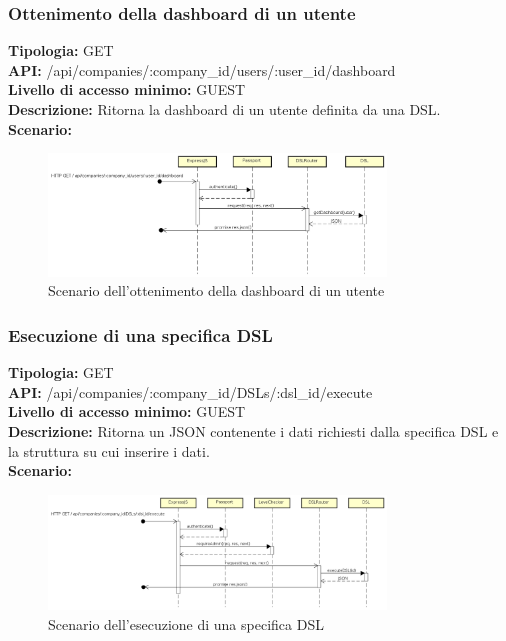 \newpage
\subsubsection{Ottenimento della dashboard di un utente}
\textbf{Tipologia:} GET \\
\textbf{API:} /api/companies/:company\_id/users/:user\_id/dashboard \\
\textbf{Livello di accesso minimo:} GUEST \\
\textbf{Descrizione:} Ritorna la dashboard di un utente definita da una DSL. \\
\textbf{Scenario:}  
\begin{figure}[h]
\centering
\includegraphics[width=0.8\textwidth]{res/sections/backend/(GET)dashboard.png}
\caption{Scenario dell'ottenimento della dashboard di un utente}
\end{figure}

\newpage
\subsubsection{Esecuzione di una specifica DSL}
\textbf{Tipologia:} GET \\
\textbf{API:} /api/companies/:company\_id/DSLs/:dsl\_id/execute \\
\textbf{Livello di accesso minimo:} GUEST \\
\textbf{Descrizione:} Ritorna un JSON contenente i dati richiesti dalla specifica DSL e la struttura su cui inserire i dati. \\
\textbf{Scenario:} 
\begin{figure}[h]
\centering
\includegraphics[width=0.8\textwidth]{res/sections/backend/(GET)dslByIDex.png}
\caption{Scenario dell'esecuzione di una specifica DSL}
\end{figure}

